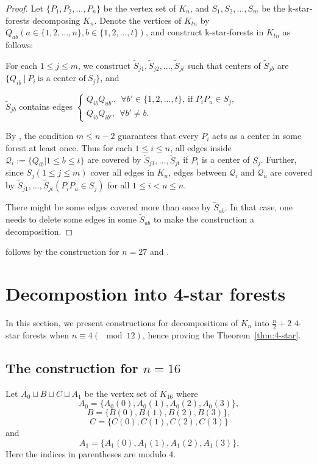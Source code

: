 \documentclass{article}
\begin{document}
\begin{proof}
Let $\{P_1,P_2,\dots,P_n\}$ be the vertex set of $K_n$, and $S_1,S_2,\dots,S_m$ be the k-star-forests decomposing $K_n$. Denote the vertices of $K_{tn}$ by $Q_{ab}(a\in\{1,2,\dots,n\}, b\in\{1,2,\dots,t\})$, and construct k-star-forests in $K_{tn}$ as follows:

For each $1\le j\le m$, we construct  $\tilde{S}_{j1},\tilde{S}_{j2},\dots,\tilde{S}_{jt}$ such that centers of $\tilde{S}_{jb}$ are $\{Q_{ib}~\big|~P_i~\text{is a center of}~S_j\}$, and
	
$\tilde{S}_{jb}$ contains edges 
$\begin{cases}
Q_{ib}Q_{ub'},~~ \forall b'\in\{1,2,\dots,t\},~\text{if }P_iP_u\in S_j,\\
Q_{ib}Q_{ib'},~~ \forall b'\neq b.
\end{cases}$
	
By , the condition $m\le n-2$ guarantees that every $P_i$ acts as a center in some forest at least once. Thus for each $1\le i\le n$, all edges inside $\mathcal{Q}_i:=\{Q_{ib}| 1\le b\le t\}$ are covered by $\tilde{S}_{j1},\dots,\tilde{S}_{jt}$ if $P_i$ is a center of $S_j$. Further, since $S_j (1\le j\le m)$ cover all edges in $K_n$, edges between $\mathcal{Q}_i$ and $\mathcal{Q}_u$ are covered by $\tilde{S}_{j1},\dots,\tilde{S}_{jt}(P_iP_u\in S_j)$ for all $1\le i<u\le n$.
	
There might be some edges covered more than once by $\tilde{S}_{ab}$. In that case, one needs to delete some edges in some $\tilde{S}_{ab}$ to make the construction a decomposition. 
\end{proof}

 follows by the construction for $n=27$ and .

\section{Decompostion into 4-star forests}\label{sec:4-star}

In this section, we present constructions for decompositions of $K_n$ into $\frac{n}{2}+2$ $4$-star forests when $n\equiv 4 (\mod 12)$, hence proving the Theorem~\ref{thm:4-star}.

\subsection{The construction for $n=16$}\label{subsec:16}
Let $A_0\sqcup B\sqcup C\sqcup A_1$ be the vertex set of $K_{16}$ where 
$$A_0=\{A_0(0),A_0(1),A_0(2),A_0(3)\},$$ 
$$B=\{B(0),B(1),B(2),B(3)\},$$ 
$$C=\{C(0),C(1),C(2),C(3)\}$$ and 
$$A_1=\{A_1(0),A_1(1),A_1(2),A_1(3)\}.$$
Here the indices in parentheses are modulo 4. 
\end{document}
